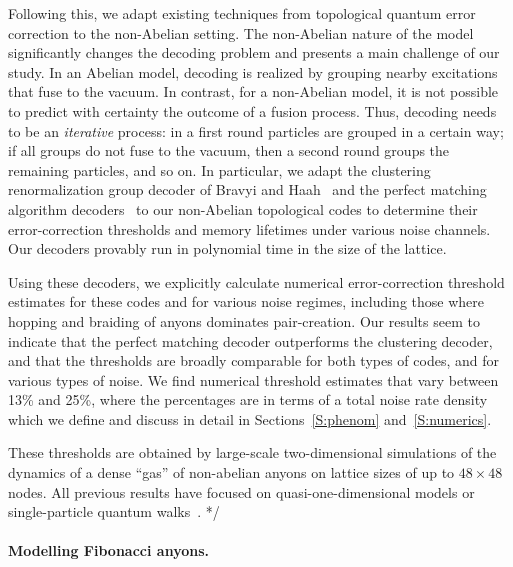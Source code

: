 \documentclass[aps, prl, letterpaper, twocolumn, superscriptaddress, notitlepage]{revtex4-1}
\begin{document}
Following this, we adapt existing techniques from topological quantum error correction to the non-Abelian setting. The non-Abelian nature of the model significantly changes the decoding problem and presents a main challenge of our study. In an Abelian model, decoding is realized by grouping nearby excitations that fuse to the vacuum. In contrast, for a non-Abelian model, it is not possible to predict with certainty the outcome of a fusion process. Thus, decoding needs to be an \emph{iterative} process: in a first round particles are grouped in a certain way; if all groups do not fuse to the vacuum, then a second round groups the remaining particles, and so on. In particular, we adapt the clustering renormalization group decoder of Bravyi and Haah~\cite{Bravyi2011} and the perfect matching algorithm decoders~\cite{Dennis2002, Wang2010} to our non-Abelian topological codes to determine their error-correction thresholds and memory lifetimes under various noise channels. Our decoders provably run in polynomial time in the size of the lattice. 

Using these decoders, we explicitly calculate numerical error-correction threshold estimates for these codes and for various noise regimes, including those where hopping and braiding of anyons dominates pair-creation. Our results seem to indicate that the perfect matching decoder outperforms the clustering decoder, and that the thresholds are broadly comparable for both types of codes, and for various types of noise. We find numerical threshold estimates that vary between 13\% and 25\%, where the percentages are in terms of a total noise rate density which we define and discuss in detail in Sections~\ref{S:phenom} and~\ref{S:numerics}. 

These thresholds are obtained by large-scale two-dimensional simulations of the dynamics of a dense ``gas'' of non-abelian anyons on lattice sizes of up to $48 \times 48$ nodes. All previous results have focused on quasi-one-dimensional models or single-particle quantum walks~\cite{Brennen2010, Lehman2011, Lehman2012, Zatloukal2012}.
*/ %



\paragraph{Modelling Fibonacci anyons.}\label{s:model}
\end{document}
